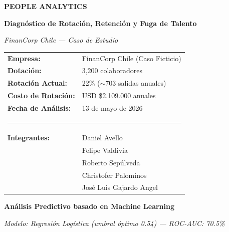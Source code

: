 \documentclass[11pt,a4paper,twoside]{article}
\begin{document}
\thispagestyle{empty}
\begin{center}
    \vspace*{2cm}
    
    {\fontsize{28}{34}\selectfont\color{darkblue}\textbf{PEOPLE ANALYTICS}}
    
    \vspace{0.5cm}
    
    {\fontsize{18}{22}\selectfont\color{lightblue}\textbf{Diagnóstico de Rotación, Retención y Fuga de Talento}}
    
    \vspace{0.5cm}
    
    {\fontsize{14}{17}\selectfont\color{accent}\textit{FinanCorp Chile — Caso de Estudio}}
    
    \vspace{3cm}
    
    
    \vspace{3cm}
    
    \begin{tabular}{ll}
        \textbf{Empresa:} & FinanCorp Chile (Caso Ficticio) \\
        \textbf{Dotación:} & 3,200 colaboradores \\
        \textbf{Rotación Actual:} & 22\% (\(\sim\)703 salidas anuales) \\
        \textbf{Costo de Rotación:} & USD \$2.109.000 anuales \\
        \textbf{Fecha de Análisis:} & 13 de mayo de 2026 \\[6pt]
        \multicolumn{2}{l}{\textcolor{darkblue}{\rule{10cm}{0.4pt}}} \\[4pt]
        \textbf{Integrantes:} & Daniel Avello \\
                              & Felipe Valdivia \\
                              & Roberto Sepúlveda \\
                              & Christofer Palominos \\
                              & José Luis Gajardo Angel \\
    \end{tabular}
    
    \vfill
    
    {\large\textbf{Análisis Predictivo basado en Machine Learning}}
    
    {\small\textit{Modelo: Regresión Logística (umbral óptimo 0.54) — ROC-AUC: 70.5\%}}
    
    \vspace{2cm}
\end{center}
\end{document}

